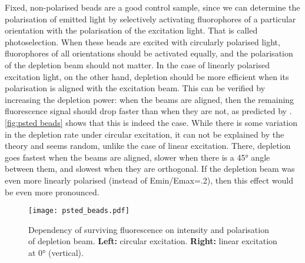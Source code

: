 Fixed, non-polarised beads are a good control sample, since we can determine the polarisation of emitted light by selectively activating fluorophores of a particular orientation with the polarisation of the excitation light. That is called photoselection.  When these beads are excited with circularly polarised light, fluorophores of all orientations should be activated equally, and the polarisation of the depletion beam should not matter. In the case of linearly polarised excitation light, on the other hand, depletion should be more efficient when its polarisation is aligned with the excitation beam. This can be verified by increasing the depletion power: when the beams are aligned, then the remaining fluorescence signal should drop faster than when they are not, as predicted by . \autoref{fig:psted beads} shows that this is indeed the case. While there is some variation in the depletion rate under circular excitation, it can not be explained by the theory and seems random, unlike the case of linear excitation. There, depletion goes fastest when the beams are aligned, slower when there is a 45° angle between them, and slowest when they are orthogonal. If the depletion beam was even more linearly polarised (instead of Emin/Emax=.2), then this effect would be even more pronounced.

\begin{figure}
	\centering
	\texttt{[image: psted\_beads.pdf]}
	\caption{
		Dependency of surviving fluorescence on intensity and polarisation of depletion beam. \textbf{Left:} circular excitation. \textbf{Right:} linear excitation at 0° (vertical). 
	}
	\label{fig:psted beads}
\end{figure}





























